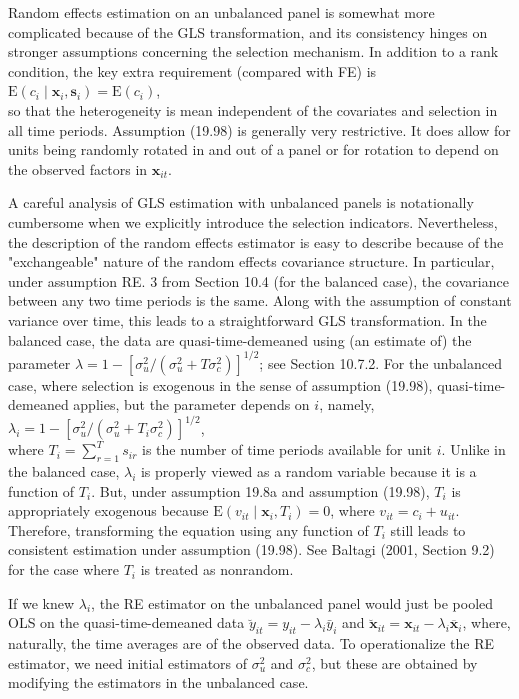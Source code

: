 \documentclass[10pt]{article}
\begin{document}
Random effects estimation on an unbalanced panel is somewhat more complicated because of the GLS transformation, and its consistency hinges on stronger assumptions concerning the selection mechanism. In addition to a rank condition, the key extra requirement (compared with FE) is\\
$\mathrm{E}\left(c_{i} \mid \mathbf{x}_{i}, \mathbf{s}_{i}\right)=\mathrm{E}\left(c_{i}\right)$,\\
so that the heterogeneity is mean independent of the covariates and selection in all time periods. Assumption (19.98) is generally very restrictive. It does allow for units being randomly rotated in and out of a panel or for rotation to depend on the observed factors in $\mathbf{x}_{i t}$.

A careful analysis of GLS estimation with unbalanced panels is notationally cumbersome when we explicitly introduce the selection indicators. Nevertheless, the description of the random effects estimator is easy to describe because of the "exchangeable" nature of the random effects covariance structure. In particular, under assumption RE. 3 from Section 10.4 (for the balanced case), the covariance between any two time periods is the same. Along with the assumption of constant variance over time, this leads to a straightforward GLS transformation. In the balanced case, the data are quasi-time-demeaned using (an estimate of) the parameter $\lambda= 1-\left[\sigma_{u}^{2} /\left(\sigma_{u}^{2}+T \sigma_{c}^{2}\right)\right]^{1 / 2}$; see Section 10.7.2. For the unbalanced case, where selection is exogenous in the sense of assumption (19.98), quasi-time-demeaned applies, but the parameter depends on $i$, namely,\\
$\lambda_{i}=1-\left[\sigma_{u}^{2} /\left(\sigma_{u}^{2}+T_{i} \sigma_{c}^{2}\right)\right]^{1 / 2}$,\\
where $T_{i}=\sum_{r=1}^{T} s_{i r}$ is the number of time periods available for unit $i$. Unlike in the balanced case, $\lambda_{i}$ is properly viewed as a random variable because it is a function of $T_{i}$. But, under assumption 19.8a and assumption (19.98), $T_{i}$ is appropriately exogenous because $\mathrm{E}\left(v_{i t} \mid \mathbf{x}_{i}, T_{i}\right)=0$, where $v_{i t}=c_{i}+u_{i t}$. Therefore, transforming the equation using any function of $T_{i}$ still leads to consistent estimation under assumption (19.98). See Baltagi (2001, Section 9.2) for the case where $T_{i}$ is treated as nonrandom.

If we knew $\lambda_{i}$, the RE estimator on the unbalanced panel would just be pooled OLS on the quasi-time-demeaned data $\breve{y}_{i t}=y_{i t}-\lambda_{i} \bar{y}_{i}$ and $\breve{\mathbf{x}}_{i t}=\mathbf{x}_{i t}-\lambda_{i} \overline{\mathbf{x}}_{i}$, where, naturally, the time averages are of the observed data. To operationalize the RE estimator, we need initial estimators of $\sigma_{u}^{2}$ and $\sigma_{c}^{2}$, but these are obtained by modifying the estimators in the unbalanced case.
\end{document}
